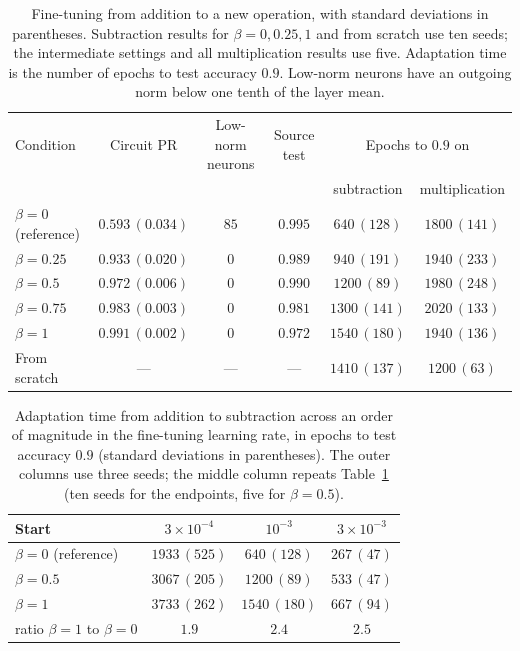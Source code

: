 \documentclass{article} %
\begin{document}
\begin{table}[!ht]
\caption{Fine-tuning from addition to a new operation, with standard deviations in parentheses. Subtraction results for $\beta = 0, 0.25, 1$ and from scratch use ten seeds; the intermediate settings and all multiplication results use five. Adaptation time is the number of epochs to test accuracy $0.9$. Low-norm neurons have an outgoing norm below one tenth of the layer mean.}
\label{tab:adapt}
\begin{center}
\footnotesize
\begin{tabular}{lccccc}
\toprule
Condition & Circuit PR & Low-norm neurons & Source test & \multicolumn{2}{c}{Epochs to $0.9$ on} \\
 & & & & subtraction & multiplication \\
\midrule
$\beta=0$ (reference) & $0.593\,(0.034)$ & $85$ & $0.995$ & $640\,(128)$  & $1800\,(141)$ \\
$\beta=0.25$         & $0.933\,(0.020)$ & $0$  & $0.989$ & $940\,(191)$  & $1940\,(233)$ \\
$\beta=0.5$          & $0.972\,(0.006)$ & $0$  & $0.990$ & $1200\,(89)$  & $1980\,(248)$ \\
$\beta=0.75$         & $0.983\,(0.003)$ & $0$  & $0.981$ & $1300\,(141)$ & $2020\,(133)$ \\
$\beta=1$            & $0.991\,(0.002)$ & $0$  & $0.972$ & $1540\,(180)$ & $1940\,(136)$ \\
From scratch         & ---              & ---  & ---     & $1410\,(137)$ & $1200\,(63)$ \\
\bottomrule
\end{tabular}
\end{center}
\end{table}

\begin{table}[!ht]
\caption{Adaptation time from addition to subtraction across an order of magnitude in the fine-tuning learning rate, in epochs to test accuracy $0.9$ (standard deviations in parentheses). The outer columns use three seeds; the middle column repeats Table~\ref{tab:adapt} (ten seeds for the endpoints, five for $\beta = 0.5$).}
\label{tab:ftlr}
\begin{center}
\small
\begin{tabular}{lccc}
\toprule
Start & $3\times 10^{-4}$ & $10^{-3}$ & $3\times 10^{-3}$ \\
\midrule
$\beta=0$ (reference) & $1933\,(525)$ & $640\,(128)$  & $267\,(47)$ \\
$\beta=0.5$          & $3067\,(205)$ & $1200\,(89)$  & $533\,(47)$ \\
$\beta=1$            & $3733\,(262)$ & $1540\,(180)$ & $667\,(94)$ \\
\midrule
ratio $\beta{=}1$ to $\beta{=}0$ & $1.9$ & $2.4$ & $2.5$ \\
\bottomrule
\end{tabular}
\end{center}
\end{table}
\end{document}
